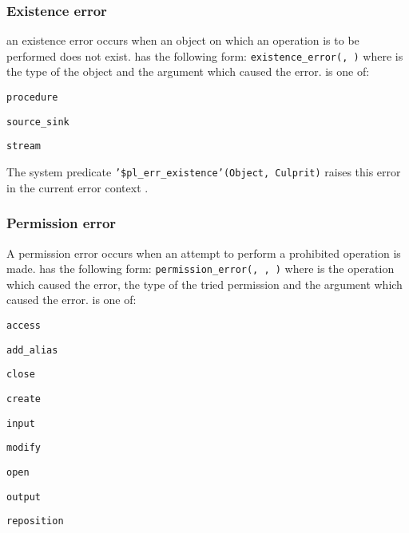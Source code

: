 \subsubsection{Existence error}
\label{Existence-error}
an existence error occurs when an object on which an operation is to be
performed does not exist.  has the following
form: \texttt{existence\_error(, )} where
 is the type of the object and
 the argument which caused the error.
 is one of:

\begin{ItemizeThreeCols}

\item \texttt{procedure}

\item \texttt{source\_sink}

\item \texttt{stream}

\end{ItemizeThreeCols}

The system predicate \texttt{'\$pl\_err\_existence'(Object, Culprit)} raises
this error in the current error context .

\subsubsection{Permission error}
\label{Permission-error}
A permission error occurs when an attempt to perform a prohibited operation
is made.  has the following form:
\texttt{permission\_error(, ,
)} where  is the operation which
caused the error,  the type of the tried
permission and  the argument which caused the
error.  is one of:

\begin{ItemizeThreeCols}

\item \texttt{access}

\item \texttt{add\_alias}

\item \texttt{close}

\item \texttt{create}

\item \texttt{input}

\item \texttt{modify}

\item \texttt{open}

\item \texttt{output}

\item \texttt{reposition}

\end{ItemizeThreeCols}

